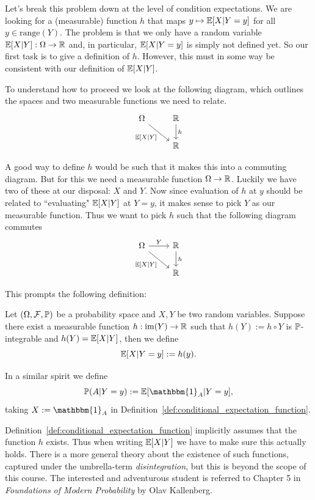 Let's break this problem down at the level of condition expectations. We are looking for a (measurable) function $h$ that maps $y \mapsto \mathbb E[X | Y = y]$ for all $y \in \mathrm{range}(Y)$. The problem is that we only have a random variable $\mathbb E[X |Y] : \Omega \to \mathbb R$ and, in particular, $\mathbb E[X | Y = y]$ is simply not defined yet. So our first task is to give a definition of $h$. However, this must in some way be consistent with our definition of $\mathbb E[X|Y]$.  

To understand how to proceed we look at the following diagram, which outlines the spaces and two measurable functions we need to relate.
\[
\begin{tikzcd}
	\Omega \arrow[dr,swap,"{\bbE[X|Y]}"] &\bbR \arrow[d,"h"]  \\
	&\bbR
\end{tikzcd}
\]

A good way to define $h$ would be such that it makes this into a commuting diagram. But for this we need a measurable function $\Omega \to \mathbb R$. Luckily we have two of these at our disposal: $X$ and $Y$. Now since evaluation of $h$ at $y$ should be related to ``evaluating" $\mathbb E[X|Y]$ at $Y = y$, it makes sense to pick $Y$ as our measurable function. Thus we want to pick $h$ such that the following diagram commutes
\[
\begin{tikzcd}
	\Omega \arrow[r,"Y"] \arrow[dr,swap,"{\bbE[X|Y]}"] &\bbR \arrow[d,"h"]  \\
	&\bbR
\end{tikzcd}
\]

This prompts the following definition:

\begin{definition}\label{def:conditional_expectation_function}
Let $(\Omega, \mathcal F, \mathbb P)$ be a probability space and $X, Y$ be two random variables. Suppose there exist a measurable function $h : \mathrm{im}(Y) \to \mathbb R$ such that $h(Y) := h \circ Y$ is $\mathbb P$-integrable and $h(Y) = \mathbb E[X | Y]$, then we define
\[
	\mathbb E[X | Y = y] := h(y).
\]
\end{definition}

In a similar spirit we define
\[
	\bbP(A | Y = y) := \bbE[\mathbbm{1}_A | Y = y],
\]
taking $X := \mathbbm{1}_A$ in Definition~\ref{def:conditional_expectation_function}.

\begin{remark}
Definition~\ref{def:conditional_expectation_function} implicitly assumes that the function $h$ exists. Thus when writing $\mathbb E[X | Y]$ we have to make sure this actually holds. There is a more general theory about the existence of such functions, captured under the umbrella-term \emph{disintegration}, but this is beyond the scope of this course. The interested and adventurous student is referred to Chapter 5 in \textit{Foundations of Modern Probability} by Olav Kallenberg. 
\end{remark}

